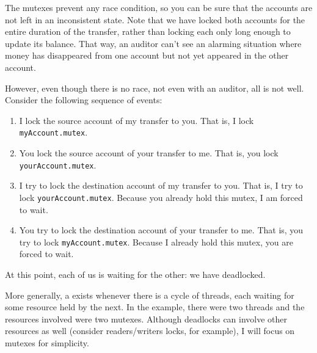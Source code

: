 The mutexes prevent any race condition, so you can be sure that the
accounts are not left in an inconsistent state.  Note that we have
locked both accounts for the entire duration of the transfer, rather
than locking each only long enough to update its balance.  That way, an
auditor can't see an alarming situation where money has disappeared
from one account but not yet appeared in the other account.

However, even though there is no race, not even with an auditor, all is not
well.  Consider the following sequence of events:
\begin{enumerate}
\item
I lock the source account of my transfer to you.  That is, I lock
\verb|myAccount.mutex|.
\item
You lock the source account of your transfer to me.  That is, you lock
\verb|yourAccount.mutex|.
\item
I try to lock the destination account of my transfer to you.  That is,
I try to lock \verb|yourAccount.mutex|.  Because you already hold this
mutex, I am forced to wait.
\item
You try to lock the destination account of your transfer to me.  That is,
you try to lock \verb|myAccount.mutex|.  Because I already hold this
mutex, you are forced to wait.
\end{enumerate}
At this point, each of us is waiting for the other: we have
deadlocked.

More generally, a  exists whenever there is a cycle of
threads, each waiting for some resource held by the next.  In the
example, there were two threads and the resources involved were two
mutexes.  Although deadlocks can involve other resources as well
(consider readers/writers locks, for example), I will focus
on mutexes for simplicity.

